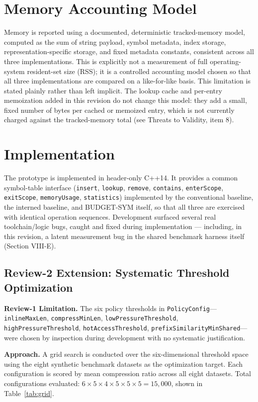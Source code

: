 \documentclass[conference]{IEEEtran}
\begin{document}
\section{Memory Accounting Model}
Memory is reported using a documented, deterministic tracked-memory model,
computed as the sum of string payload, symbol metadata, index storage,
representation-specific storage, and fixed metadata constants, consistent
across all three implementations. This is explicitly not a measurement of
full operating-system resident-set size (RSS); it is a controlled accounting
model chosen so that all three implementations are compared on a
like-for-like basis. This limitation is stated plainly rather than left
implicit. The lookup cache and per-entry memoization added in this revision
do not change this model: they add a small, fixed number of bytes per cached
or memoized entry, which is not currently charged against the tracked-memory
total (see Threats to Validity, item 8).

\section{Implementation}
The prototype is implemented in header-only C++14. It provides a common
symbol-table interface (\texttt{insert}, \texttt{lookup}, \texttt{remove},
\texttt{contains}, \texttt{enterScope}, \texttt{exitScope},
\texttt{memoryUsage}, \texttt{statistics}) implemented by the conventional
baseline, the interned baseline, and BUDGET-SYM itself, so that all three
are exercised with identical operation sequences. Development surfaced
several real toolchain/logic bugs, caught and fixed during implementation
--- including, in this revision, a latent measurement bug in the shared
benchmark harness itself (Section VIII-E).

\subsection{Review-2 Extension: Systematic Threshold Optimization}
\textbf{Review-1 Limitation.} The six policy thresholds in
\texttt{PolicyConfig}---\texttt{inlineMaxLen}, \texttt{compressMinLen},
\texttt{lowPressureThreshold}, \texttt{highPressureThreshold},
\texttt{hotAccessThreshold}, \texttt{prefixSimilarityMinShared}---were chosen
by inspection during development with no systematic justification.

\textbf{Approach.} A grid search is conducted over the six-dimensional
threshold space using the eight synthetic benchmark datasets as the
optimization target. Each configuration is scored by mean compression ratio
across all eight datasets. Total configurations evaluated: $6 \times 5
\times 4 \times 5 \times 5 \times 5 = 15{,}000$, shown in Table~\ref{tab:grid}.
\end{document}
